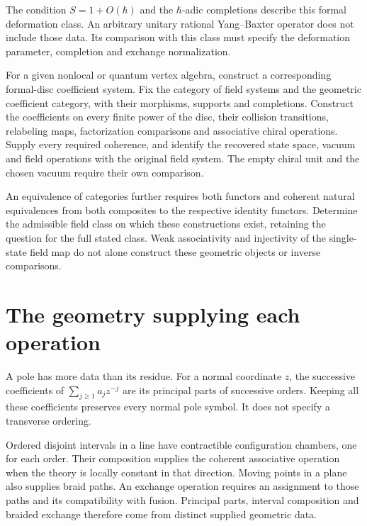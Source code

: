 The condition $S=1+O(\hbar)$ and the $\hbar$-adic completions describe this formal deformation class.
An arbitrary unitary rational Yang--Baxter operator does not include those data.
Its comparison with this class must specify the deformation parameter, completion and exchange normalization.

\begin{problem}\label{cbc:two:reverse}
For a given nonlocal or quantum vertex algebra, construct a corresponding formal-disc coefficient system.
Fix the category of field systems and the geometric coefficient category, with their morphisms, supports and completions.
Construct the coefficients on every finite power of the disc, their collision transitions, relabeling maps, factorization comparisons and associative chiral operations.
Supply every required coherence, and identify the recovered state space, vacuum and field operations with the original field system.
The empty chiral unit and the chosen vacuum require their own comparison.

An equivalence of categories further requires both functors and coherent natural equivalences from both composites to the respective identity functors.
Determine the admissible field class on which these constructions exist, retaining the question for the full stated class.
Weak associativity and injectivity of the single-state field map do not alone construct these geometric objects or inverse comparisons.
\end{problem}

\section{The geometry supplying each operation}
A pole has more data than its residue.
For a normal coordinate $z$, the successive coefficients of
$\sum_{j\geq1}a_jz^{-j}$ are its principal parts of successive orders.
Keeping all these coefficients preserves every normal pole symbol.
It does not specify a transverse ordering.

Ordered disjoint intervals in a line have contractible configuration
chambers, one for each order. Their composition supplies the coherent
associative operation when the theory is locally constant in that
direction. Moving points in a plane also supplies braid paths.
An exchange operation requires an assignment to those paths and
its compatibility with fusion.
Principal parts, interval composition and braided exchange therefore
come from distinct supplied geometric data.

